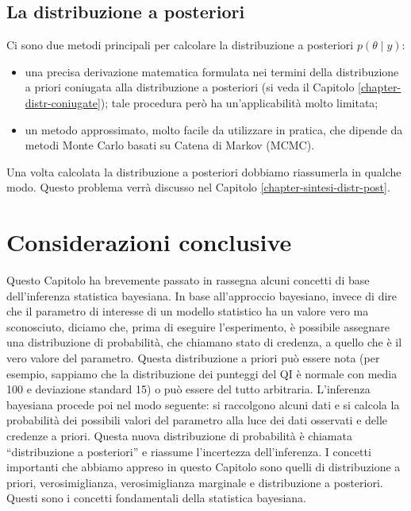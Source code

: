 \documentclass[
  10pt,
  italian,
  a4paper,
  extrafontsizes,onecolumn,openright
  ]{memoir}
\providecommand{\tightlist}{%
  \setlength{\itemsep}{0pt}\setlength{\parskip}{0pt}}
\begin{document}
\hypertarget{la-distribuzione-a-posteriori}{%
\subsection{La distribuzione a posteriori}\label{la-distribuzione-a-posteriori}}

Ci sono due metodi principali per calcolare la distribuzione a posteriori \(p(\theta \mid y)\):

\begin{itemize}
\tightlist
\item
  una precisa derivazione matematica formulata nei termini della distribuzione a priori coniugata alla distribuzione a posteriori (si veda il Capitolo \ref{chapter-distr-coniugate}); tale procedura però ha un'applicabilità molto limitata;
\item
  un metodo approssimato, molto facile da utilizzare in pratica, che dipende da metodi Monte Carlo basati su Catena di Markov (MCMC).
\end{itemize}

Una volta calcolata la distribuzione a posteriori dobbiamo riassumerla in qualche modo. Questo problema verrà discusso nel Capitolo \ref{chapter-sintesi-distr-post}.

\hypertarget{considerazioni-conclusive}{%
\section*{Considerazioni conclusive}\label{considerazioni-conclusive}}

Questo Capitolo ha brevemente passato in rassegna alcuni concetti di base dell'inferenza statistica bayesiana. In base all'approccio bayesiano, invece di dire che il parametro di interesse di un modello statistico ha un valore vero ma sconosciuto, diciamo che, prima di eseguire l'esperimento, è possibile assegnare una distribuzione di probabilità, che chiamano stato di credenza, a quello che è il vero valore del parametro. Questa distribuzione a priori può essere nota (per esempio, sappiamo che la distribuzione dei punteggi del QI è normale con media 100 e deviazione standard 15) o può essere del tutto arbitraria. L'inferenza bayesiana procede poi nel modo seguente: si raccolgono alcuni dati e si calcola la probabilità dei possibili valori del parametro alla luce dei dati osservati e delle credenze a priori. Questa nuova distribuzione di probabilità è chiamata ``distribuzione a posteriori'' e riassume l'incertezza dell'inferenza. I concetti importanti che abbiamo appreso in questo Capitolo sono quelli di distribuzione a priori, verosimiglianza, verosimiglianza marginale e distribuzione a posteriori. Questi sono i concetti fondamentali della statistica bayesiana.
\end{document}
